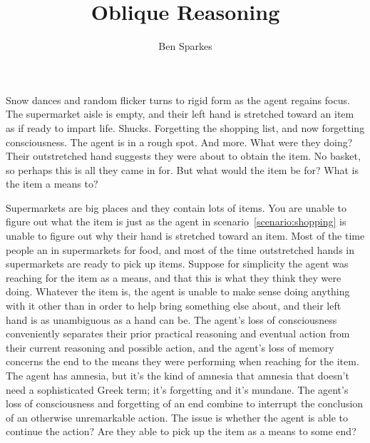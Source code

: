 \documentclass[10pt]{article}
\title{Oblique Reasoning}
\author{Ben Sparkes}
\begin{document}


\begin{scenario}\label{scenario:shopping}
  Snow dances and random flicker turns to rigid form as the agent regains focus.
  The supermarket aisle is empty, and their left hand is stretched toward an item as if ready to impart life.
  Shucks.
  Forgetting the shopping list, and now forgetting consciousness.
  The agent is in a rough spot.
  And more.
  What were they doing?
  Their outstretched hand suggests they were about to obtain the item.
  No basket, so perhaps this is all they came in for.
  But what would the item be for?
  What is the item a means to?
\end{scenario}

Supermarkets are big places and they contain lots of items.
You are unable to figure out what the item is just as the agent in scenario~\ref{scenario:shopping} is unable to figure out why their hand is stretched toward an item.
Most of the time people an in supermarkets for food, and most of the time outstretched hands in supermarkets are ready to pick up items.
Suppose for simplicity the agent was reaching for the item as a means, and that this is what they think they were doing.
Whatever the item is, the agent is unable to make sense doing anything with it other than in order to help bring something else about, and their left hand is as unambiguous as a hand can be.
The agent's loss of consciousness conveniently separates their prior practical reasoning and eventual action from their current reasoning and possible action, and the agent's loss of memory concerns the end to the means they were performing when reaching for the item.
The agent has amnesia, but it's the kind of amnesia that amnesia that doesn't need a sophisticated Greek term; it's forgetting and it's mundane.
The agent's loss of consciousness and forgetting of an end combine to interrupt the conclusion of an otherwise unremarkable action.
The issue is whether the agent is able to continue the action?
Are they able to pick up the item as a means to some end?
\end{document}
